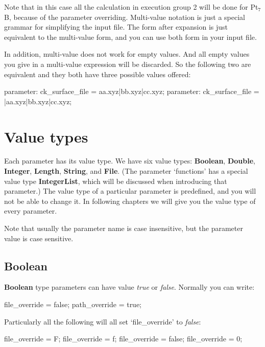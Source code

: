 \documentclass[11pt]{book}
\begin{document}
Note that in this case all the calculation in execution group 2 will be done for Pt${}_7$B, because of the parameter 
overriding. Multi-value notation is just a special grammar for simplifying the input file. The form after expansion 
is just equivalent to the multi-value form, and you can use both form in your input file.

In addition, multi-value does not work for empty values. And all empty values you give in a multi-value expression 
will be discarded. So the following two are equivalent and they both have three possible values offered:

\begin{everbatim}
{ parameter: ck_surface_file = aa.xyz|bb.xyz|cc.xyz; }
{ parameter: ck_surface_file = |aa.xyz|bb.xyz|cc.xyz; }
\end{everbatim}

\section{Value types}

Each parameter has its value type. We have six value types: \textbf{Boolean}, \textbf{Double}, \textbf{Integer}, 
\textbf{Length}, \textbf{String}, and \textbf{File}. (The parameter `functions' has a special value type \textbf{IntegerList}, 
which will be discussed when introducing that parameter.)
 The value type of a particular parameter is predefined, and you will not be able
to change it. In following chapters we will give you the value type of every parameter.

Note that usually the parameter name is case insensitive, but the parameter value is case sensitive.

\subsection{Boolean}

\textbf{Boolean} type parameters can have value \emph{true} or \emph{false}. Normally you can write:

\begin{everbatim}
file_override = false;
path_override = true;
\end{everbatim}

Particularly all the following will all set `file\_override' to \emph{false}:

\begin{everbatim}
file_override = F; file_override = f; 
file_override = false; file_override = 0;
\end{everbatim}
\end{document}
